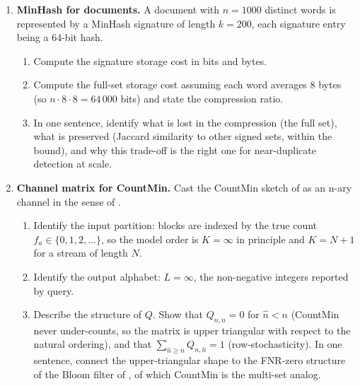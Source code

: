 \begin{enumerate}
\item \exstarstar
\label{ex:ch10-7}
\textbf{MinHash for documents.}
A document with $n = 1000$ distinct words is represented by a
MinHash signature of length $k = 200$, each signature entry being
a $64$-bit hash.
\begin{enumerate}
  \item[(a)] Compute the signature storage cost in bits and bytes.
  \item[(b)] Compute the full-set storage cost assuming each word
    averages $8$ bytes (so $n \cdot 8 \cdot 8 = 64\,000$ bits) and
    state the compression ratio.
  \item[(c)] In one sentence, identify what is lost in the
    compression (the full set), what is preserved (Jaccard
    similarity to other signed sets, within the
     bound), and why this trade-off is
    the right one for near-duplicate detection at scale.
\end{enumerate}

\item \exstarstar
\label{ex:ch10-8}
\textbf{Channel matrix for CountMin.}
Cast the CountMin sketch of  as an n-ary
channel in the sense of .
\begin{enumerate}
  \item[(a)] Identify the input partition: blocks are indexed by
    the true count $f_a \in \{0, 1, 2, \ldots\}$, so the model
    order is $K = \infty$ in principle and $K = N + 1$ for a
    stream of length $N$.
  \item[(b)] Identify the output alphabet: $L = \infty$, the
    non-negative integers reported by query.
  \item[(c)] Describe the structure of $Q$. Show that
    $Q_{n, \hat{n}} = 0$ for $\hat{n} < n$ (CountMin never
    under-counts, so the matrix is upper triangular with respect
    to the natural ordering), and that $\sum_{\hat{n} \ge n}
    Q_{n, \hat{n}} = 1$ (row-stochasticity). In one sentence,
    connect the upper-triangular shape to the FNR-zero structure
    of the Bloom filter of , of which
    CountMin is the multi-set analog.
\end{enumerate}



\end{enumerate}
